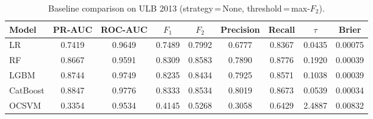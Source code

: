 \begin{table}[ht!]
\centering
\caption{Baseline comparison on ULB 2013 (strategy\,=\,None, threshold\,=\,max-$F_2$).}
\label{tab:baseline_ulb}
\begin{tabular}{l c c c c c c c c}
\toprule
Model & PR-AUC & ROC-AUC & $F_1$ & $F_2$ & Precision & Recall & $\tau$ & Brier \\
\midrule
LR         & 0.7419 & 0.9649 & 0.7489 & 0.7992 & 0.6777 & 0.8367 & 0.0435 & 0.00075 \\
RF         & 0.8667 & 0.9591 & 0.8309 & 0.8583 & 0.7890 & 0.8776 & 0.1920 & 0.00039 \\
LGBM       & 0.8744 & 0.9749 & 0.8235 & 0.8434 & 0.7925 & 0.8571 & 0.1038 & 0.00039 \\
CatBoost   & 0.8847 & 0.9776 & 0.8333 & 0.8534 & 0.8019 & 0.8673 & 0.0539 & 0.00034 \\
OCSVM      & 0.3354 & 0.9534 & 0.4145 & 0.5268 & 0.3058 & 0.6429 & 2.4887 & 0.00832 \\
\bottomrule
\end{tabular}
\end{table}
